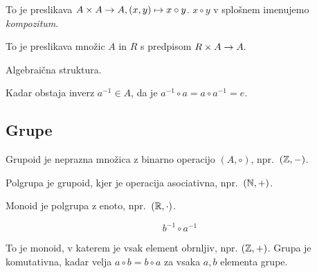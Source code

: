 To je preslikava $A \times A \to A, (x, y) \mapsto x \circ y$. $x\circ y$ v splošnem imenujemo \textit{kompozitum}.


To je preslikava množic $A$ in $R$ s predpisom $R\times A \to A.$


Algebraična struktura.


Kadar obstaja inverz $a^{-1} \in A$, da je $a^{-1} \circ a = a \circ a^{-1} = e$.

\subsection{Grupe}


Grupoid je neprazna množica z binarno operacijo $(A, \circ)$, npr.~$(\mathbb{Z}, -)$.

Polgrupa je grupoid, kjer je operacija asociativna, npr.~$(\mathbb{N}, +)$.

Monoid je polgrupa z enoto, npr.~$(\mathbb{R}, \cdot)$.


\[
	b^{-1} \circ a^{-1}
\]


To je monoid, v katerem je vsak element obrnljiv, npr. $(\mathbb{Z}, +)$. Grupa je komutativna, kadar velja $a \circ b = b \circ a$ za vsaka $a, b$ elementa grupe.